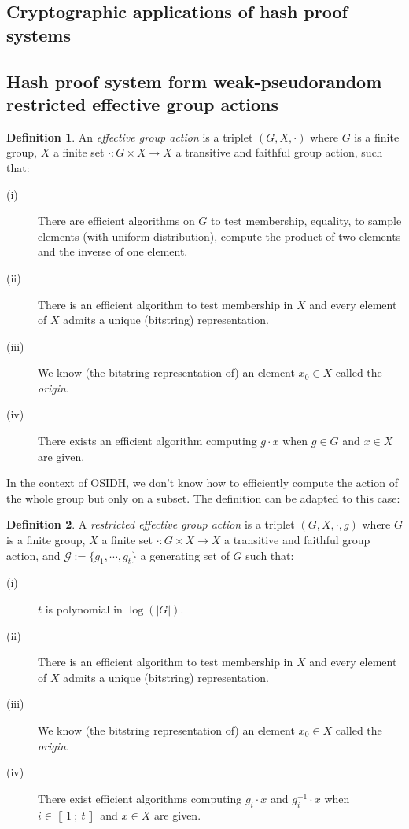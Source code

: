 \documentclass[a4paper,10pt]{report}
\theoremstyle{definition}
\newtheorem{definition}{Definition}[chapter]
\theoremstyle{plain}
\theoremstyle{definition}
\newcommand{\m}[1]{\mathcal{#1}}
\renewcommand{\i}[2]{\left\llbracket #1~;~#2\right\rrbracket}
\renewcommand{\(}{\left(}
\renewcommand{\)}{\right)}
\begin{document}
\subsection{Cryptographic applications of hash proof systems}

\subsection{Hash proof system form weak-pseudorandom restricted effective group actions}

\begin{definition}\cite[definition 2]{DeFeo1}
An \emph{effective group action} is a triplet $(G,X,\cdot)$ where $G$ is a finite group, $X$ a finite set $\cdot : G\times X\longrightarrow X$ a transitive and faithful group action, such that:
\begin{description}
\item[(i)] There are efficient algorithms on $G$ to test membership, equality,  to sample elements (with uniform distribution), compute the product of two elements and the inverse of one element.
\item[(ii)] There is an efficient algorithm to test membership in $X$ and every element of $X$ admits a unique (bitstring) representation.
\item[(iii)] We know (the bitstring representation of) an element $x_0\in X$ called the \emph{origin}.
\item[(iv)] There exists an efficient algorithm computing $g\cdot x$ when $g\in G$ and $x\in X$ are given.
\end{description}
\end{definition}

In the context of OSIDH, we don't know how to efficiently compute the action of the whole group but only on a subset. The definition can be adapted to this case:

\begin{definition}\cite[definition 6]{DeFeo1}
A \emph{restricted effective group action} is a triplet $(G,X,\cdot,g)$ where $G$ is a finite group, $X$ a finite set $\cdot : G\times X\longrightarrow X$ a transitive and faithful group action, and $\m{G}:=\{g_1,\cdots, g_t\}$ a generating set of $G$ such that:
\begin{description}
\item[(i)] $t$ is polynomial in $\log(|G|)$.
\item[(ii)] There is an efficient algorithm to test membership in $X$ and every element of $X$ admits a unique (bitstring) representation.
\item[(iii)] We know (the bitstring representation of) an element $x_0\in X$ called the \emph{origin}.
\item[(iv)] There exist efficient algorithms computing $g_i\cdot x$ and $g_i^{-1}\cdot x$ when $i\in\i{1}{t}$ and $x\in X$ are given.
\end{description}
\end{definition}
\end{document}

